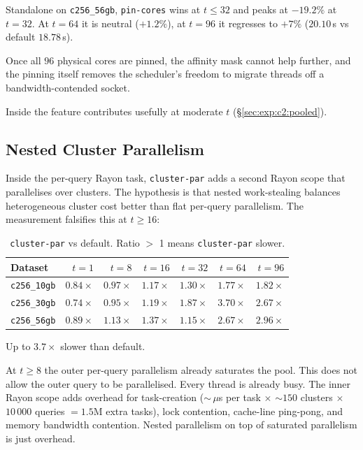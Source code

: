 Standalone on \texttt{c256\_56gb}, \texttt{pin-cores} wins at $t \leq 32$ and peaks at $-19.2\%$ at $t=32$. At $t=64$ it is neutral ($+1.2\%$), at $t=96$ it regresses to $+7\%$ ($20.10$\,s vs default $18.78$\,s).

Once all $96$ physical cores are pinned, the affinity mask cannot help further, and the pinning itself removes the scheduler's freedom to migrate threads off a bandwidth-contended socket.

Inside \bcombo{} the feature contributes usefully at moderate $t$ (§\ref{sec:exp:c2:pooled}).


\subsection{Nested Cluster Parallelism\label{sec:exp:scaling:clusterpar}}

Inside the per-query Rayon task, \texttt{cluster-par} adds a second Rayon scope that parallelises over clusters. The hypothesis is that nested work-stealing balances heterogeneous cluster cost better than flat per-query parallelism. The measurement falsifies this at $t \ge 16$:

\begin{table}[H]
  \centering
  \caption[\texttt{cluster-par} vs.\ default.]{\texttt{cluster-par} vs default. Ratio $>$ 1 means \texttt{cluster-par} slower.}
  \label{tab:clusterpar}
  \begin{tabular}{lrrrrrr}
    \toprule
    Dataset & $t{=}1$ & $t{=}8$ & $t{=}16$ & $t{=}32$ & $t{=}64$ & $t{=}96$ \\
    \midrule
    \texttt{c256\_10gb} & $0.84\times$ & $0.97\times$ & $1.17\times$ & $1.30\times$ & $\mathbf{1.77\times}$ & $\mathbf{1.82\times}$ \\
    \texttt{c256\_30gb} & $0.74\times$ & $0.95\times$ & $1.19\times$ & $1.87\times$ & $\mathbf{3.70\times}$ & $\mathbf{2.67\times}$ \\
    \texttt{c256\_56gb} & $0.89\times$ & $1.13\times$ & $1.37\times$ & $1.15\times$ & $\mathbf{2.67\times}$ & $\mathbf{2.96\times}$ \\
    \bottomrule
  \end{tabular}
\end{table}

Up to $3.7\times$ slower than default.

 At $t \ge 8$ the outer per-query parallelism already saturates the pool. This does not allow the outer query to be parallelised. Every thread is already busy. The inner Rayon scope adds overhead for task-creation ($\sim\,\mu$s per task $\times$ $\sim\!150$ clusters $\times$ $10\,000$ queries $= 1.5$M extra tasks), lock contention, cache-line ping-pong, and memory bandwidth contention. Nested parallelism on top of saturated parallelism is just overhead.


